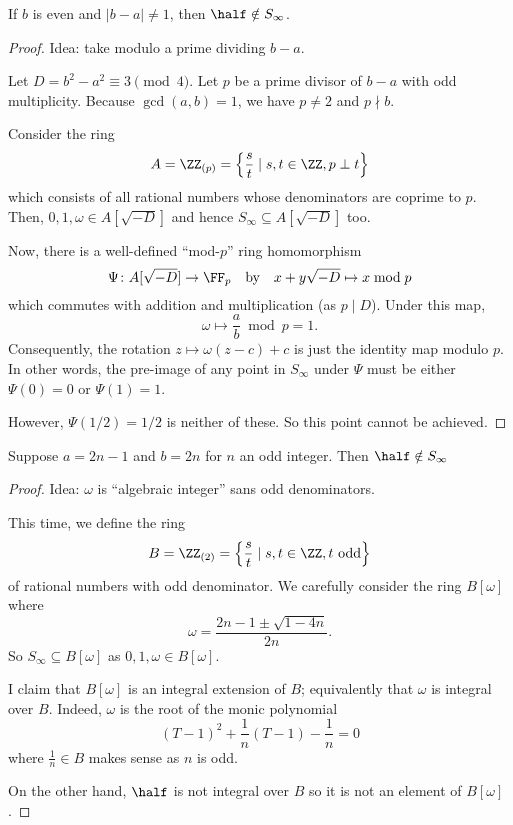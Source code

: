 \documentclass[11pt]{scrartcl}
\begin{document}
\begin{claim*}
  If $b$ is even and $|b-a| \neq 1$, then $\half \notin S_\infty$.
\end{claim*}
\begin{proof}
  Idea: take modulo a prime dividing $b-a$.

  Let $D = b^2-a^2 \equiv 3 \pmod 4$.
  Let $p$ be a prime divisor of $b-a$ with odd multiplicity.
  Because $\gcd(a,b) = 1$, we have $p \neq 2$ and $p \nmid b$.

  Consider the ring
  \[ A = \ZZ_{(p)} = \left\{ \frac{s}{t} \mid s,t \in \ZZ, p \perp t \right\} \]
  which consists of all rational numbers
  whose denominators are coprime to $p$.
  Then, $0, 1, \omega \in A[\sqrt{-D}]$
  and hence $S_\infty \subseteq A[\sqrt{-D}]$ too.

  Now, there is a well-defined ``mod-$p$'' ring homomorphism
  \[ \Psi \colon A[\sqrt{-D}] \to \FF_p \quad\text{by}\quad
    x+y\sqrt{-D} \mapsto x \bmod p \]
  which commutes with addition and multiplication (as $p \mid D$).
  Under this map,
  \[ \omega \mapsto \frac ab \bmod p = 1. \]
  Consequently, the rotation $z \mapsto \omega(z-c)+c$
  is just the identity map modulo $p$.
  In other words, the pre-image of any point in $S_\infty$
  under $\Psi$ must be either $\Psi(0) = 0$ or $\Psi(1) = 1$.

  However, $\Psi(1/2) = 1/2$ is neither of these.
  So this point cannot be achieved.
\end{proof}

\begin{claim*}
  Suppose $a = 2n-1$ and $b=2n$ for $n$ an odd integer.
  Then $\half \notin S_\infty$
\end{claim*}
\begin{proof}
  Idea: $\omega$ is ``algebraic integer'' sans odd denominators.

  This time, we define the ring
  \[ B = \ZZ_{(2)} = \left\{ \frac{s}{t} \mid s,t \in \ZZ, t \text{ odd} \right\} \]
  of rational numbers with odd denominator.
  We carefully consider the ring $B[\omega]$ where
  \[ \omega = \frac{2n-1 \pm \sqrt{1-4n}}{2n}. \]
  So $S_\infty \subseteq B[\omega]$ as $0, 1, \omega \in B[\omega]$.

  I claim that $B[\omega]$ is an integral extension of $B$;
  equivalently that $\omega$ is integral over $B$.
  Indeed, $\omega$ is the root of the monic polynomial
  \[  (T-1)^2 + \frac1n (T-1) - \frac 1n = 0 \]
  where $\frac1n \in B$ makes sense as $n$ is odd.

  On the other hand, $\half$ is not integral over $B$
  so it is not an element of $B[\omega]$.
\end{proof}
\end{document}
